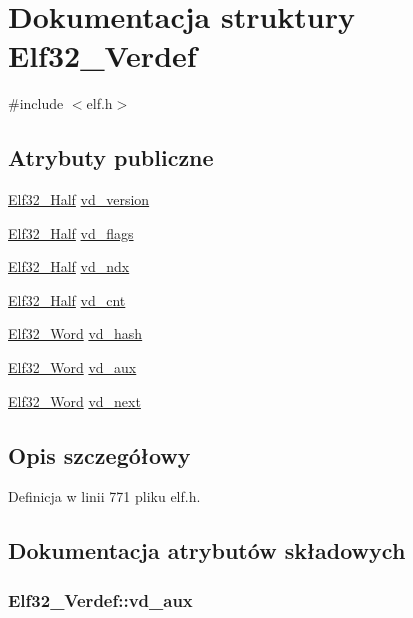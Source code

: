 \hypertarget{struct_elf32___verdef}{\section{Dokumentacja struktury Elf32\-\_\-\-Verdef}
\label{struct_elf32___verdef}
}


{\ttfamily \#include $<$elf.\-h$>$}

\subsection*{Atrybuty publiczne}
\begin{DoxyCompactItemize}
\item 
\hyperlink{elf_8h_a2ff0787d7d1bae0f251192806a2974ca}{Elf32\-\_\-\-Half} \hyperlink{struct_elf32___verdef_ad2f222a352ff9e2d92199811ff094822}{vd\-\_\-version}
\item 
\hyperlink{elf_8h_a2ff0787d7d1bae0f251192806a2974ca}{Elf32\-\_\-\-Half} \hyperlink{struct_elf32___verdef_a782382383f96808eeddb86e3db2737c3}{vd\-\_\-flags}
\item 
\hyperlink{elf_8h_a2ff0787d7d1bae0f251192806a2974ca}{Elf32\-\_\-\-Half} \hyperlink{struct_elf32___verdef_afcaa14f5175bb38ecb6ef832c2aa2232}{vd\-\_\-ndx}
\item 
\hyperlink{elf_8h_a2ff0787d7d1bae0f251192806a2974ca}{Elf32\-\_\-\-Half} \hyperlink{struct_elf32___verdef_a38c7ed683760f798e42ff3c411ea23ba}{vd\-\_\-cnt}
\item 
\hyperlink{elf_8h_af5924ece606c732e86f8263a19408e45}{Elf32\-\_\-\-Word} \hyperlink{struct_elf32___verdef_aed64e7dede5f8150f10457c420b48416}{vd\-\_\-hash}
\item 
\hyperlink{elf_8h_af5924ece606c732e86f8263a19408e45}{Elf32\-\_\-\-Word} \hyperlink{struct_elf32___verdef_a3693473efde66cb13cecda2053c91f9d}{vd\-\_\-aux}
\item 
\hyperlink{elf_8h_af5924ece606c732e86f8263a19408e45}{Elf32\-\_\-\-Word} \hyperlink{struct_elf32___verdef_ac919bdca49dff2f3a04b1328903edb71}{vd\-\_\-next}
\end{DoxyCompactItemize}


\subsection{Opis szczegółowy}


Definicja w linii 771 pliku elf.\-h.



\subsection{Dokumentacja atrybutów składowych}
\hypertarget{struct_elf32___verdef_a3693473efde66cb13cecda2053c91f9d}{
\subsubsection[{vd\-\_\-aux}]{ Elf32\-\_\-\-Verdef\-::vd\-\_\-aux}}\label{struct_elf32___verdef_a3693473efde66cb13cecda2053c91f9d}


